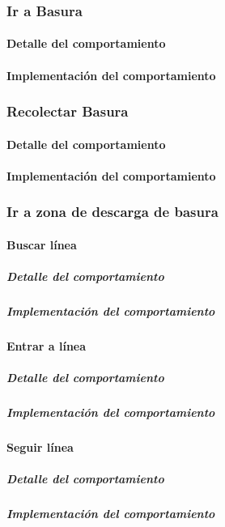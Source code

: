 \subsubsection{Ir a Basura}
\label{go_to_garbage}
\paragraph{Detalle del comportamiento}
\paragraph{Implementaci\'on del comportamiento}

\subsubsection{Recolectar Basura}
\label{collect_garbage}
\paragraph{Detalle del comportamiento}
\paragraph{Implementaci\'on del comportamiento}

\subsubsection{Ir a zona de descarga de basura}
\label{go_to_unload_zone}

\paragraph{Buscar l\'inea}
\label{find_line}
\subparagraph{Detalle del comportamiento}
\subparagraph{Implementaci\'on del comportamiento}

\paragraph{Entrar a l\'inea}
\label{enter_line}
\subparagraph{Detalle del comportamiento}
\subparagraph{Implementaci\'on del comportamiento}

\paragraph{Seguir l\'inea}
\label{follow_line}
\subparagraph{Detalle del comportamiento}
\subparagraph{Implementaci\'on del comportamiento}

